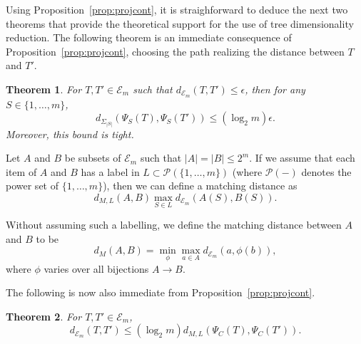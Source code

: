 \documentclass[a4paper,11pt]{article}
\newtheorem{theorem}{Theorem}
\newcommand{\aE}{\mathcal{E}}
\newcommand{\aP}{\mathcal{P}}
\begin{document}
Using Proposition~\ref{prop:projcont}, it is straighforward to deduce the next two theorems that provide the theoretical support for the use of tree dimensionality reduction.
The following theorem is an immediate consequence of Proposition~\ref{prop:projcont}, choosing the path realizing the distance between $T$ and $T'$.

\begin{theorem}\label{thm:stab}
For $T,T' \in \aE_m$ such that $d_{\aE_m}(T,T') \leq \epsilon$, then for any $S \in \{1,\ldots,m\}$,
\[
d_{\Sigma_{|S|}}(\Psi_S(T), \Psi_S(T')) \leq (\log_2 m)\epsilon.
\]
Moreover, this bound is tight.
\end{theorem}

Let $A$ and $B$ be subsets of $\aE_m$ such that $|A| = |B| \leq 2^m$.
If we assume that each item of $A$ and $B$ has a label in $L \subset \aP(\{1,\ldots,m\})$ (where $\aP(-)$ denotes the power set of $\{1,\ldots,m\}$), then we can define a matching distance as
\[
d_{M,L}(A,B) \max_{S \in L} d_{\aE_m}(A(S), B(S)).
\]

Without assuming such a labelling, we define the matching distance between $A$ and $B$ to be 
\[
d_M(A,B) = \min_{\phi} \max_{a \in A} d_{\aE_m}(a,\phi(b)),
\]
where $\phi$ varies over all bijections $A \to B$.

The following is now also immediate from Proposition~\ref{prop:projcont}.

\begin{theorem}\label{thm:converse}
For $T, T' \in \aE_m$, 
\[
d_{\aE_m}(T,T') \leq (\log_2 m) d_{M,L}(\Psi_C(T), \Psi_C(T')).
\]
\end{theorem}
\end{document}
